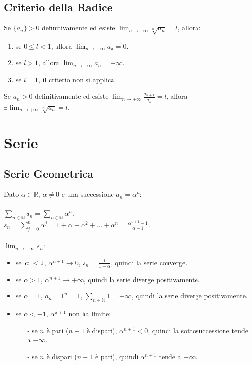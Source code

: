 \documentclass{article}
\begin{document}
\subsection{Criterio della Radice}

Se $\{a_n\} > 0$ definitivamente ed esiste $\displaystyle \lim_{n \to + \infty} \sqrt[n]{a_n} = l$, allora:

\begin{enumerate}
    \item se $0 \leq l < 1$, allora $\displaystyle \lim_{n \to + \infty} a_n = 0$.
    \item se $l > 1$, allora $\displaystyle \lim_{n \to + \infty} a_n = + \infty$.
    \item se $l = 1$, il criterio non si applica.
\end{enumerate}

Se $a_n > 0$ definitivamente ed esiste $\displaystyle \lim_{n \to + \infty} \frac{a_{n+1}}{a_n} = l$, allora $\displaystyle \exists \lim_{n \to + \infty} \sqrt[n]{a_n} = l$.

\section{Serie}

\subsection{Serie Geometrica}

Dato $\alpha \in \mathbb{R}$, $\alpha \neq 0$ e una successione $a_n = \alpha^n$: \\ \\
$\displaystyle \sum_{n \in \mathbb{N}} a_n = \sum_{n \in \mathbb{N}} \alpha^n$. \\
$\displaystyle s_n = \sum_{j = 0}^n \alpha^j = 1 + \alpha + \alpha^2 + \dots + \alpha^n = \frac{\alpha^{n+1}-1}{\alpha-1}$. \\ \\
$\displaystyle \lim_{n \to + \infty} s_n$:

\begin{itemize}
    \item se $\abs{\alpha} < 1$, $\alpha^{n+1} \to 0$, $s_n = \frac{1}{1-\alpha}$, quindi la serie converge.
    \item se $\alpha > 1$, $\alpha^{n+1} \to + \infty$, quindi la serie diverge positivamente.
    \item se $\alpha = 1$, $a_n = 1^n = 1$, $\displaystyle \sum_{n \in \mathbb{N}} 1 = + \infty$, quindi la serie diverge positivamente.
    \item se $\alpha < -1$, $\alpha^{n+1}$ non ha limite:
    \begin{itemize}
        \item[-] se $n$ è pari ($n+1$ è dispari), $\alpha^{n+1} < 0$, quindi la sottosuccessione tende a $- \infty$.
        \item[-] se $n$ è dispari ($n+1$ è pari), quindi $\alpha^{n+1}$ tende a $+ \infty$. 
    \end{itemize}
\end{itemize}
\end{document}
